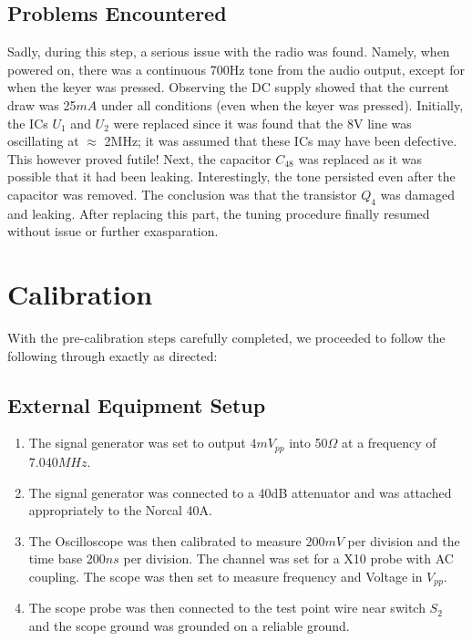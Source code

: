 \documentclass{./cls/hw}
\begin{document}
\subsection{Problems Encountered}
Sadly, during this step, a serious issue with the 
radio was found. Namely, when powered on, there was 
a continuous 700Hz tone from the audio output, 
except for when the keyer was pressed. Observing the DC supply showed that the
current draw was 25$mA$ under all conditions (even when the keyer was pressed).
Initially, the ICs $U_1$ and $U_2$ were replaced since it was found that the 8V line was oscillating at $\approx$ 
2MHz; it was assumed that these ICs may have been defective.
This however proved futile! Next, the capacitor $C_{48}$ was replaced as it was
possible that it had been leaking. Interestingly, the tone persisted even after
the capacitor was removed. The conclusion was that the transistor $Q_4$ was
damaged and leaking. After replacing this part, the tuning procedure finally resumed
without issue or further exasparation.

\section{Calibration}
With the pre-calibration steps carefully completed, we proceeded to follow the
following through exactly as directed:
\subsection{External Equipment Setup}
\begin{enumerate}
  \item The signal generator was set to output $4mV_{pp}$ into 50$\Omega$ at a
    frequency of $7.040MHz$.
  \item The signal generator was connected to a 40dB attenuator and was
    attached appropriately to the Norcal 40A.
  \item The Oscilloscope was then calibrated to measure 200$mV$ per division
    and the time base 200$ns$ per division. The channel was set for a X10 probe
    with AC coupling. The scope was then set to measure frequency and Voltage
    in $V_{pp}$.
  \item The scope probe was then connected to the test point wire near switch
    $S_2$ and the scope ground was grounded on a reliable ground.
\end{enumerate}
\end{document}
